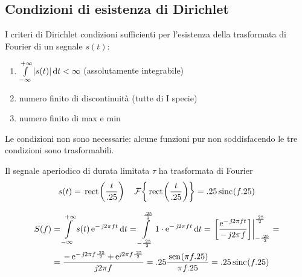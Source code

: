 \subsection{Condizioni di esistenza di Dirichlet}
I criteri di Dirichlet condizioni sufficienti per l'esistenza della trasformata di Fourier di un segnale $s(t)$:
\begin{enumerate}
\item $\int\limits_{-\infty}^{+\infty}{\left|{s(t)}\right|}{\,\mathop{}\!\mathrm{d}{t}}<\infty$ (assolutamente integrabile)
\item numero finito di discontinuità (tutte di I specie)
\item numero finito di max e min
\end{enumerate}
\begin{nota}Le condizioni non sono necessarie: alcune funzioni pur non soddisfacendo le tre condizioni sono trasformabili.\end{nota}
\begin{esempio}
Il segnale aperiodico di durata limitata $\tau$ ha trasformata di Fourier
\[s(t)=\,{\operatorname{rect}}^{}\!\left({\frac{t}{.25}}\right)\quad\operatorname{\mathcal{F}}\!\left\lbrace{\,{\operatorname{rect}}^{}\!\left({\frac{t}{.25}}\right)}\right\rbrace=.25\,{\operatorname{sinc}}^{}\!\left({f.25}\right) \]

\begin{figure}[h!]
\centering
{}\qquad
{}
\end{figure}

\[\begin{split}S(f)&=\intinf{s(t)\e{-\imath 2\pi f t}}{t}
=\intd{-\frac{\tau}{2}}{\frac{\tau}{2}}{1\cdot\e{-\imath 2\pi f t}}{t}
=\bound{-\frac{\tau}{2}}{\frac{\tau}{2}}{\frac{\e{-\imath 2\pi f t}}{-\imath 2\pi f}}=\\
&=\frac{-\e{-\imath 2\pi f\frac{\tau}{2}}+\e{\imath 2\pi f\frac{\tau}{2}}}{\imath 2\pi f} 
=\tau\frac{\sen{\pi f\tau}}{\pi f\tau}
=\tau\sinc{f\tau}
\end{split}\]
\end{esempio}

